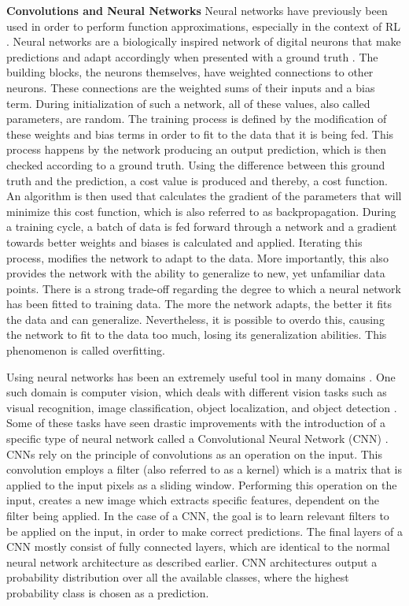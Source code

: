 \noindent
\textbf{Convolutions and Neural Networks} \newline 
Neural networks have previously been used in order to perform function 
approximations, especially in the context of RL \cite{rlsolvingatari}. Neural networks 
are a biologically inspired network of digital neurons that make predictions and 
adapt accordingly when presented with a ground truth \cite{neuralnets}. The building 
blocks, the neurons 
themselves, have weighted connections to other neurons. These connections 
are the weighted sums of their inputs and a bias term. During initialization of such 
a network, all of these values, also called parameters, are random. The training process 
is defined by the 
modification of these weights and bias terms in order to fit to the data that it is 
being fed. This process happens by the network producing an output prediction, which 
is then checked according to a ground truth. Using the difference between this ground truth and 
the prediction, a cost value is produced and thereby, a cost function. 
An algorithm is then used that calculates the gradient of the parameters that will minimize 
this cost function, which is also referred to as backpropagation. During a training cycle, 
a batch of data is fed forward through a network 
and a gradient towards better weights and biases is calculated and applied. Iterating 
this process, modifies the network to adapt to the data. More importantly, this 
also provides the network with the ability to generalize to new, yet unfamiliar 
data points. There is a strong trade-off regarding the degree to which  a neural 
network has been fitted to training data. The more the network adapts, the better it 
fits the data and can generalize. Nevertheless, it is possible to overdo this, causing 
the network to fit to the data too much, losing its generalization abilities. This 
phenomenon is called overfitting.  

Using neural networks has been an extremely useful tool in many 
domains \cite{riseofneuralnets, NeuralNetworkApplications}. One such domain is 
computer vision, which deals with different vision tasks such as 
visual recognition, image classification, object localization, and object detection 
\cite{CNNapplications2}. Some of these tasks have seen drastic improvements with the 
introduction of a specific type of neural network called a Convolutional Neural 
Network (CNN) \cite{CNNapplications, CNNintroduction, firstcnn}. CNNs rely on the 
principle of convolutions as an operation on the input. This convolution employs a filter 
(also referred to as a kernel) which is a matrix that is applied to the input pixels as a 
sliding window. Performing this operation on the input, creates a new image which 
extracts specific features, dependent on the filter being applied. In the case of 
a CNN, the goal is to learn relevant filters to be applied on the input, in order 
to make correct predictions. The final layers of a CNN mostly consist of fully 
connected layers, which are identical to the normal neural network architecture as 
described earlier. CNN architectures output a probability distribution 
over all the available classes, where the highest probability class is chosen 
as a prediction. 

